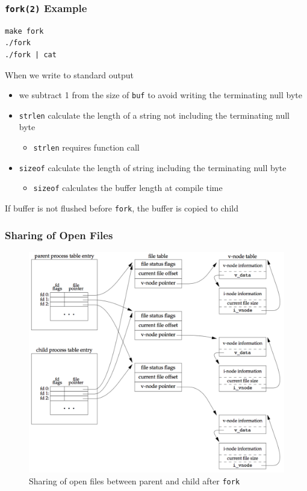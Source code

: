 \documentclass[newPxFont,sthlmFooter,nooffset]{beamer}
\begin{document}
\begin{frame}
  \frametitle{\texttt{fork(2)} Example}

\begin{verbatim}
make fork
./fork
./fork | cat
\end{verbatim}

When we write to standard output
\begin{itemize}
\item we subtract 1 from the size of \texttt{buf} to avoid writing the terminating null byte
\item \texttt{strlen} calculate the length of a string not including the terminating null byte
  \begin{itemize}
  \item \footnotesize \texttt{strlen} requires function call
  \end{itemize}
\item \texttt{sizeof} calculate the length of string including the terminating null byte
  \begin{itemize}
  \item \footnotesize \texttt{sizeof} calculates the buffer length at compile time
  \end{itemize}
\end{itemize}

If buffer is not flushed before \texttt{fork}, the buffer is copied to child
\end{frame}

\begin{frame}
  \frametitle{Sharing of Open Files}
  \begin{figure}[h]
    \centering
    \includegraphics[height=0.9\textheight]{figure/fig8-2_sharing.png}
    \caption{Sharing of open files between parent and child after \texttt{fork}}
  \end{figure}
\end{frame}
\end{document}
